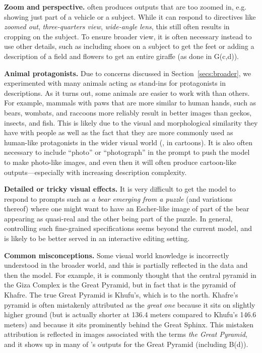 \textbf{Zoom and perspective.} \bdraw often produces outputs that are too zoomed in, e.g. showing just part of a vehicle or a subject. While it can respond to directives like \textit{zoomed out}, \textit{three-quarters view}, \textit{wide-angle lens}, this still often results in cropping on the subject. To ensure broader view, it is often necessary instead to use other details, such as including shoes on a subject to get the feet or adding a description of a field and flowers to get an entire giraffe (as done in G(c,d)).
     
\textbf{Animal protagonists.} Due to concerns discussed in Section~\ref{secs:broader}, we experimented with many animals acting as stand-ins for protagonists in descriptions. As it turns out, some animals are easier to work with than others. For example, mammals with paws that are more similar to human hands, such as bears, wombats, and raccoons more reliably result in better images than geckos, insects, and fish. This is likely due to the visual and morphological similarity they have with people as well as the fact that they are more commonly used as human-like protagonists in the wider visual world (\eg, in cartoons). It is also often necessary to include ``photo'' or ``photograph'' in the prompt to push the model to make photo-like images, and even then it will often produce cartoon-like outputs---especially with increasing description complexity.

\textbf{Detailed or tricky visual effects.} It is very difficult to get the model to respond to prompts such as \textit{a bear emerging from a puzzle} (and variations thereof) where one might want to have an Escher-like image of part of the bear appearing as quasi-real and the other being part of the puzzle. In general, controlling such fine-grained specifications seems beyond the current model, and is likely to be better served in an interactive editing setting.
    
\textbf{Common misconceptions.} Some visual world knowledge is incorrectly understood in the broader world, and this is partially reflected in the data and then the model. For example, it is commonly thought that the central pyramid in the Giza Complex is the Great Pyramid, but in fact that is the pyramid of Khafre. The true Great Pyramid is Khufu's, which is to the north. Khafre's pyramid is often mistakenly attributed as the \textit{great one} because it sits on slightly higher ground (but is actually shorter at 136.4 meters compared to Khufu's 146.6 meters) and because it sits prominently behind the Great Sphinx. This mistaken attribution is reflected in images associated with the terms \textit{the Great Pyramid}, and it shows up in many of \bdraw's outputs for the Great Pyramid (including B(d)).

